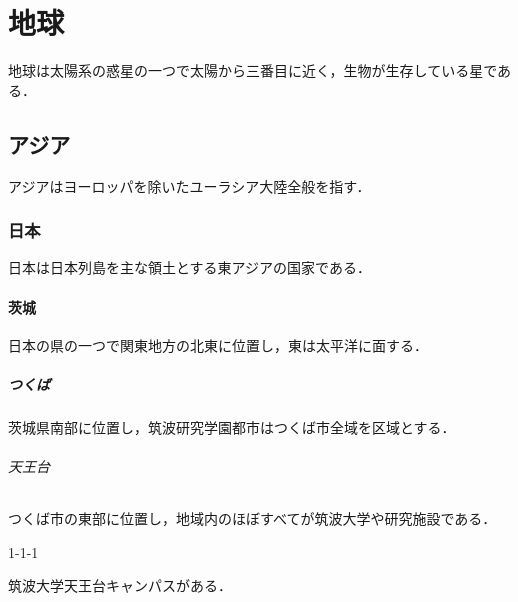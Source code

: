\documentclass[a4j]{jbook}
\begin{document}
\part{地球}
 地球は太陽系の惑星の一つで太陽から三番目に近く，生物が生存している星である．

 \chapter{アジア}
 アジアはヨーロッパを除いたユーラシア大陸全般を指す．

 \section{日本}
 日本は日本列島を主な領土とする東アジアの国家である．

 \subsection{茨城}
 日本の県の一つで関東地方の北東に位置し，東は太平洋に面する．

 \subsubsection{つくば}
 茨城県南部に位置し，筑波研究学園都市はつくば市全域を区域とする．

 \paragraph{天王台}
 つくば市の東部に位置し，地域内のほぼすべてが筑波大学や研究施設である．

 \subparagraph{1-1-1}
 筑波大学天王台キャンパスがある．
\end{document}
